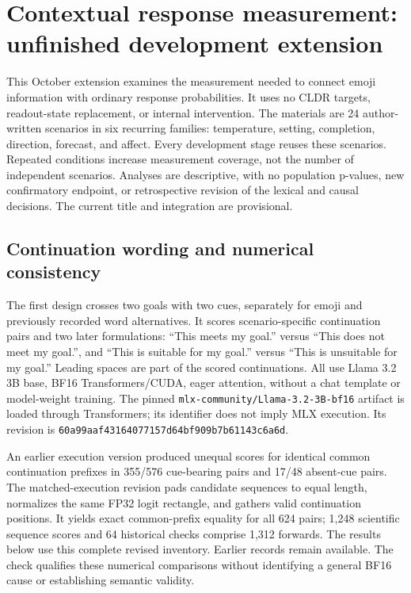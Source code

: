 \section{Contextual response measurement: unfinished development extension}
\label{app:contextual}

This October extension examines the measurement needed to connect emoji
information with ordinary response probabilities. It uses no CLDR targets,
readout-state replacement, or internal intervention. The materials are 24
author-written scenarios in six recurring families: temperature, setting,
completion, direction, forecast, and affect. Every development stage reuses
these scenarios. Repeated conditions increase measurement coverage, not the
number of independent scenarios. Analyses are descriptive, with no population
p-values, new confirmatory endpoint, or retrospective revision of the
lexical and causal decisions. The current title and integration are provisional.

\subsection{Continuation wording and numerical consistency}

The first design crosses two goals with two cues, separately for emoji and
previously recorded word alternatives. It scores scenario-specific
continuation pairs and two later formulations: ``This meets my goal.'' versus
``This does not meet my goal.'', and ``This is suitable for my goal.'' versus
``This is unsuitable for my goal.'' Leading spaces are part of the scored
continuations. All use Llama 3.2 3B base, BF16 Transformers/CUDA, eager
attention, without a chat template or model-weight training. The pinned
\texttt{mlx-community/Llama-3.2-3B-bf16} artifact is loaded through Transformers;
its identifier does not imply MLX execution. Its revision is
\texttt{60a99aaf43164077157d64bf909b7b61143c6a6d}.

An earlier execution version produced unequal scores for identical common
continuation prefixes in 355/576 cue-bearing pairs and 17/48 absent-cue pairs.
The matched-execution revision pads candidate sequences to equal length,
normalizes the same FP32 logit rectangle, and gathers valid continuation
positions. It yields exact common-prefix equality for all 624 pairs; 1,248
scientific sequence scores and 64 historical checks comprise 1,312 forwards.
The results below use this complete revised inventory. Earlier records remain
available. The check qualifies these numerical comparisons without identifying
a general BF16 cause or establishing semantic validity.


